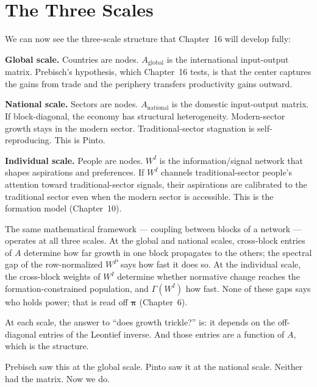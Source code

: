 \documentclass[../structural_economics_book.tex]{subfiles}
\begin{document}
\section{The Three Scales}
\label{ch03:sec:three_scales}

We can now see the three-scale structure that Chapter~16 will develop fully:

\textbf{Global scale.} Countries are nodes. $A_{\text{global}}$ is the international input-output matrix. Prebisch's hypothesis, which Chapter~16 tests, is that the center captures the gains from trade and the periphery transfers productivity gains outward.

\textbf{National scale.} Sectors are nodes. $A_{\text{national}}$ is the domestic input-output matrix. If block-diagonal, the economy has structural heterogeneity. Modern-sector growth stays in the modern sector. Traditional-sector stagnation is self-reproducing. This is Pinto.

\textbf{Individual scale.} People are nodes. $W^I$ is the information/signal network that shapes aspirations and preferences. If $W^I$ channels traditional-sector people's attention toward traditional-sector signals, their aspirations are calibrated to the traditional sector even when the modern sector is accessible. This is the formation model (Chapter~10).

\begin{keyinsight}
The same mathematical framework --- coupling between blocks of a network --- operates at all three scales. At the global and national scales, cross-block entries of $A$ determine how far growth in one block propagates to the others; the spectral gap of the row-normalized $W^P$ says how fast it does so. At the individual scale, the cross-block weights of $W^I$ determine whether normative change reaches the formation-constrained population, and $\Gamma(W^I)$ how fast. None of these gaps says who holds power; that is read off $\boldsymbol{\pi}$ (Chapter~6).

At each scale, the answer to ``does growth trickle?'' is: it depends on the off-diagonal entries of the Leontief inverse. And those entries are a function of $A$, which is the structure.

Prebisch saw this at the global scale. Pinto saw it at the national scale. Neither had the matrix. Now we do.
\end{keyinsight}
\end{document}
